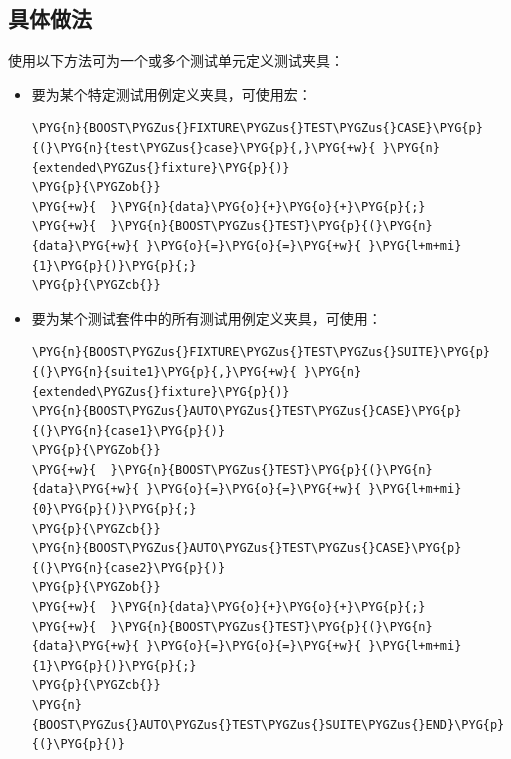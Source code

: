 
\subsection{具体做法}



使用以下方法可为一个或多个测试单元定义测试夹具：



\begin{itemize}
\item 要为某个特定测试用例定义夹具，可使用宏：



\begin{codeblockbg}
\begin{Verbatim}[commandchars=\\\{\},breaklines=true,breakanywhere=true,fontsize=\codefont,xleftmargin=17bp]
\PYG{n}{BOOST\PYGZus{}FIXTURE\PYGZus{}TEST\PYGZus{}CASE}\PYG{p}{(}\PYG{n}{test\PYGZus{}case}\PYG{p}{,}\PYG{+w}{ }\PYG{n}{extended\PYGZus{}fixture}\PYG{p}{)}
\PYG{p}{\PYGZob{}}
\PYG{+w}{  }\PYG{n}{data}\PYG{o}{+}\PYG{o}{+}\PYG{p}{;}
\PYG{+w}{  }\PYG{n}{BOOST\PYGZus{}TEST}\PYG{p}{(}\PYG{n}{data}\PYG{+w}{ }\PYG{o}{=}\PYG{o}{=}\PYG{+w}{ }\PYG{l+m+mi}{1}\PYG{p}{)}\PYG{p}{;}
\PYG{p}{\PYGZcb{}}
\end{Verbatim}
\end{codeblockbg}



\item 要为某个测试套件中的所有测试用例定义夹具，可使用：



\begin{codeblockbg}
\begin{Verbatim}[commandchars=\\\{\},breaklines=true,breakanywhere=true,fontsize=\codefont,xleftmargin=17bp]
\PYG{n}{BOOST\PYGZus{}FIXTURE\PYGZus{}TEST\PYGZus{}SUITE}\PYG{p}{(}\PYG{n}{suite1}\PYG{p}{,}\PYG{+w}{ }\PYG{n}{extended\PYGZus{}fixture}\PYG{p}{)}
\PYG{n}{BOOST\PYGZus{}AUTO\PYGZus{}TEST\PYGZus{}CASE}\PYG{p}{(}\PYG{n}{case1}\PYG{p}{)}
\PYG{p}{\PYGZob{}}
\PYG{+w}{  }\PYG{n}{BOOST\PYGZus{}TEST}\PYG{p}{(}\PYG{n}{data}\PYG{+w}{ }\PYG{o}{=}\PYG{o}{=}\PYG{+w}{ }\PYG{l+m+mi}{0}\PYG{p}{)}\PYG{p}{;}
\PYG{p}{\PYGZcb{}}
\PYG{n}{BOOST\PYGZus{}AUTO\PYGZus{}TEST\PYGZus{}CASE}\PYG{p}{(}\PYG{n}{case2}\PYG{p}{)}
\PYG{p}{\PYGZob{}}
\PYG{+w}{  }\PYG{n}{data}\PYG{o}{+}\PYG{o}{+}\PYG{p}{;}
\PYG{+w}{  }\PYG{n}{BOOST\PYGZus{}TEST}\PYG{p}{(}\PYG{n}{data}\PYG{+w}{ }\PYG{o}{=}\PYG{o}{=}\PYG{+w}{ }\PYG{l+m+mi}{1}\PYG{p}{)}\PYG{p}{;}
\PYG{p}{\PYGZcb{}}
\PYG{n}{BOOST\PYGZus{}AUTO\PYGZus{}TEST\PYGZus{}SUITE\PYGZus{}END}\PYG{p}{(}\PYG{p}{)}
\end{Verbatim}
\end{codeblockbg}



\end{itemize}
